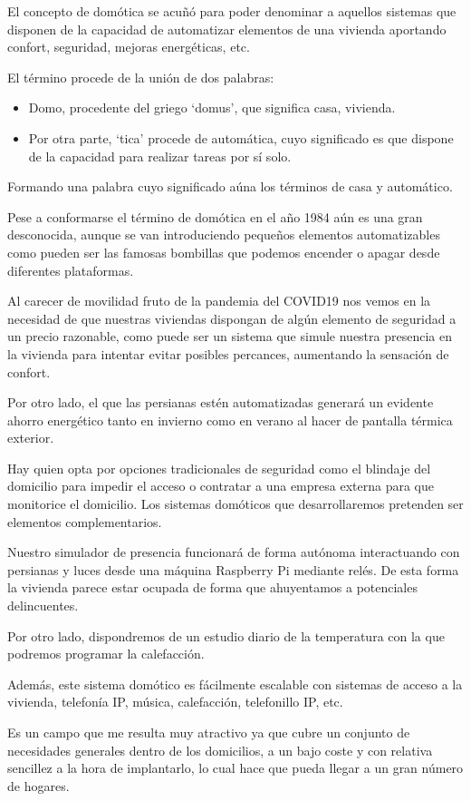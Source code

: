 
El concepto de domótica se acuñó para poder denominar a aquellos sistemas que disponen de la capacidad de automatizar elementos de una vivienda aportando confort, seguridad, mejoras energéticas, etc.

El término procede de la unión de dos palabras:

\begin{itemize}
    \item Domo, procedente del griego ‘domus’, que significa casa, vivienda.
    \item Por otra parte, ‘tica’ procede de automática, cuyo significado es que dispone de la capacidad para realizar tareas por sí solo.
\end{itemize}

Formando una palabra cuyo significado aúna los términos de casa y automático.

Pese a conformarse el término de domótica en el año 1984 aún es una gran desconocida, aunque se van introduciendo pequeños elementos automatizables como pueden ser las famosas bombillas que podemos encender o apagar desde diferentes plataformas.

Al carecer de movilidad fruto de la pandemia del COVID19 nos vemos en la necesidad de que nuestras viviendas dispongan de algún elemento de seguridad a un precio razonable, como puede ser un sistema que simule nuestra presencia en la vivienda para intentar evitar posibles percances, aumentando la sensación de confort.

Por otro lado, el que las persianas estén automatizadas generará un evidente ahorro energético tanto en invierno como en verano al hacer de pantalla térmica exterior.

Hay quien opta por opciones tradicionales de seguridad como el blindaje del domicilio para impedir el acceso o contratar a una empresa externa para que monitorice el domicilio. Los sistemas domóticos que desarrollaremos pretenden ser elementos complementarios.

Nuestro simulador de presencia funcionará de forma autónoma interactuando con persianas y luces desde una máquina Raspberry Pi mediante relés. De esta forma la vivienda parece estar ocupada de forma que ahuyentamos a potenciales delincuentes.

Por otro lado, dispondremos de un estudio diario de la temperatura con la que podremos programar la calefacción.

Además, este sistema domótico es fácilmente escalable con sistemas de acceso a la vivienda, telefonía IP, música, calefacción, telefonillo IP, etc.

Es un campo que me resulta muy atractivo ya que cubre un conjunto de necesidades generales dentro de los domicilios, a un bajo coste y con relativa sencillez a la hora de implantarlo, lo cual hace que pueda llegar a un gran número de hogares.
